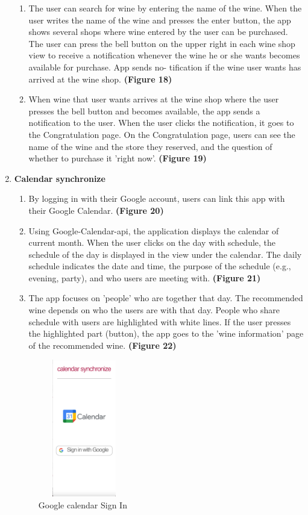 \documentclass[sigconf, nonacm]{acmart}
\begin{document}
\begin{enumerate}
\begin{enumerate}
    \item The user can search for wine by entering
the name of the wine. When the user writes
the name of the wine and presses the enter
button, the app shows several shops where
wine entered by the user can be purchased.\\
The user can press the bell button on the upper
right in each wine shop view to receive a
notification whenever the wine he or she wants
becomes available for purchase. App sends no-
tification if the wine user wants has arrived at
the wine shop. \textbf{(Figure 18)}
\item When wine that user wants arrives at the wine
shop where the user presses the bell button
and becomes available, the app sends a
notification to the user. When the user clicks
the notification, it goes to the Congratulation
page. On the Congratulation page, users can
see the name of the wine and the store they
reserved, and the question of whether to
purchase it ’right now’. \textbf{(Figure 19)}
\end{enumerate}
   
    \item \textbf{Calendar synchronize}

    \begin{enumerate}
        \item By logging in with their Google account, users can
link this app with their Google Calendar. \textbf{(Figure 20)}
        \item Using Google-Calendar-api, the application
displays the calendar of current month. When
the user clicks on the day with schedule, the
schedule of the day is displayed in the view under
the calendar. The daily schedule indicates the
date and time, the purpose of the schedule (e.g.,
evening, party), and who users are meeting with. \textbf{(Figure 21)}

        \item The app focuses on ’people’ who are together that
day. The recommended wine depends on who the
users are with that day. People who share schedule
with users are highlighted with white lines. If
the user presses the highlighted part (button), the
app goes to the ’wine information’ page of the
recommended wine. \textbf{(Figure 22)}
    \end{enumerate}
  
 \begin{figure}
  \centering
  \includegraphics[width=4cm, height=6cm]{calendar.png}
  \caption{Google calendar Sign In}
  \label{fig:google calendar sign in}
\end{figure}


\end{enumerate}
\end{document}
